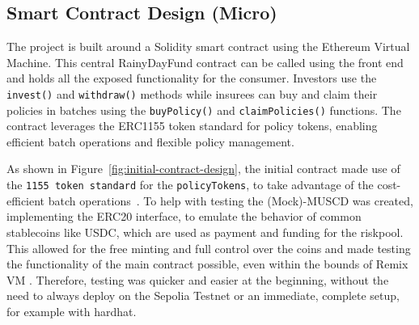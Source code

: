 \documentclass[11pt,a4paper]{article}
\begin{document}
	\subsection{Smart Contract Design (Micro)}\label{subsec:smart-contract-design}
	The project is built around a Solidity smart contract using the Ethereum Virtual Machine.
	This central RainyDayFund contract can be called using the front end and holds all the exposed functionality for the consumer.
	Investors use the \texttt{invest()} and \texttt{withdraw()} methods while insurees can buy and claim their policies in batches using the \texttt{buyPolicy()} and \texttt{claimPolicies()} functions.
	The contract leverages the ERC1155 token standard for policy tokens, enabling efficient batch operations and flexible policy management.

	As shown in Figure~\ref{fig:initial-contract-design}, the initial contract made use of the \texttt{1155 token standard} for the \texttt{policyTokens}, to take advantage of the cost-efficient batch operations~\parencite{ERC1155}.
	To help with testing the (Mock)-MUSCD was created, implementing the ERC20 interface, to emulate the behavior of common stablecoins like USDC, which are used as payment and funding for the riskpool.
	This allowed for the free minting and full control over the coins and made testing the functionality of the main contract possible, even within the bounds of Remix VM .
	Therefore, testing was quicker and easier at the beginning, without the need to always deploy on the Sepolia Testnet or an immediate, complete setup, for example with hardhat.
\end{document}
